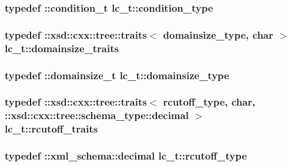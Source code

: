 \hypertarget{classlc__t_aeb4f39b796939efd5541331610d5e28e}{
\subsubsection[{condition\-\_\-type}]{\setlength{\rightskip}{0pt plus 5cm}typedef \-::{\bf condition\-\_\-t} {\bf lc\-\_\-t\-::condition\-\_\-type}}}\label{classlc__t_aeb4f39b796939efd5541331610d5e28e}
\hypertarget{classlc__t_af080ee9e8205b4e027f18eaa42a8bdfa}{
\subsubsection[{domainsize\-\_\-traits}]{\setlength{\rightskip}{0pt plus 5cm}typedef \-::xsd\-::cxx\-::tree\-::traits$<$ {\bf domainsize\-\_\-type}, char $>$ {\bf lc\-\_\-t\-::domainsize\-\_\-traits}}}\label{classlc__t_af080ee9e8205b4e027f18eaa42a8bdfa}
\hypertarget{classlc__t_a14e4ab30758da00bc9f186b0ef06a97e}{
\subsubsection[{domainsize\-\_\-type}]{\setlength{\rightskip}{0pt plus 5cm}typedef \-::{\bf domainsize\-\_\-t} {\bf lc\-\_\-t\-::domainsize\-\_\-type}}}\label{classlc__t_a14e4ab30758da00bc9f186b0ef06a97e}
\hypertarget{classlc__t_a0e4c76efd7229ca57c957d12422c9ebc}{
\subsubsection[{rcutoff\-\_\-traits}]{\setlength{\rightskip}{0pt plus 5cm}typedef \-::xsd\-::cxx\-::tree\-::traits$<$ {\bf rcutoff\-\_\-type}, char, \-::xsd\-::cxx\-::tree\-::schema\-\_\-type\-::decimal $>$ {\bf lc\-\_\-t\-::rcutoff\-\_\-traits}}}\label{classlc__t_a0e4c76efd7229ca57c957d12422c9ebc}
\hypertarget{classlc__t_aeee50e2ac6fe42996cb39a92ad78883e}{
\subsubsection[{rcutoff\-\_\-type}]{\setlength{\rightskip}{0pt plus 5cm}typedef \-::{\bf xml\-\_\-schema\-::decimal} {\bf lc\-\_\-t\-::rcutoff\-\_\-type}}}\label{classlc__t_aeee50e2ac6fe42996cb39a92ad78883e}


